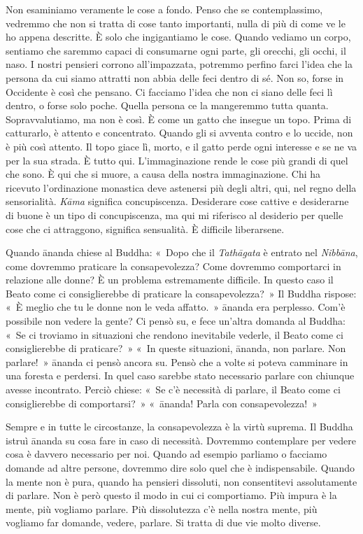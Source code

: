 Non esaminiamo veramente le cose a fondo. Penso che se contemplassimo,
vedremmo che non si tratta di cose tanto importanti, nulla di più di
come ve le ho appena descritte. È solo che ingigantiamo le cose. Quando
vediamo un corpo, sentiamo che saremmo capaci di consumarne ogni parte,
gli orecchi, gli occhi, il naso. I nostri pensieri corrono
all'impazzata, potremmo perfino farci l'idea che la persona da cui siamo
attratti non abbia delle feci dentro di sé. Non so, forse in Occidente è
così che pensano. Ci facciamo l'idea che non ci siano delle feci lì
dentro, o forse solo poche. Quella persona ce la mangeremmo tutta
quanta. Sopravvalutiamo, ma non è così. È come un gatto che insegue un
topo. Prima di catturarlo, è attento e concentrato. Quando gli si
avventa contro e lo uccide, non è più così attento. Il topo giace lì,
morto, e il gatto perde ogni interesse e se ne va per la sua strada. È
tutto qui. L'immaginazione rende le cose più grandi di quel che sono. È
qui che si muore, a causa della nostra immaginazione. Chi ha ricevuto
l'ordinazione monastica deve astenersi più degli altri, qui, nel regno
della sensorialità. \emph{Kāma} significa concupiscenza. Desiderare cose
cattive e desiderarne di buone è un tipo di concupiscenza, ma qui mi
riferisco al desiderio per quelle cose che ci attraggono, significa
sensualità. È difficile liberarsene.

Quando ānanda chiese al Buddha: «~Dopo che il \emph{Tathāgata} è entrato
nel \emph{Nibbāna}, come dovremmo praticare la consapevolezza? Come
dovremmo comportarci in relazione alle donne? È un problema estremamente
difficile. In questo caso il Beato come ci consiglierebbe di praticare
la consapevolezza?~» Il Buddha rispose: «~È meglio che tu le donne non
le veda affatto.~» ānanda era perplesso. Com'è possibile non vedere la
gente? Ci pensò su, e fece un'altra domanda al Buddha: «~Se ci troviamo
in situazioni che rendono inevitabile vederle, il Beato come ci
consiglierebbe di praticare?~» «~In queste situazioni, ānanda, non
parlare. Non parlare!~» ānanda ci pensò ancora su. Pensò che a volte si
poteva camminare in una foresta e perdersi. In quel caso sarebbe stato
necessario parlare con chiunque avesse incontrato. Perciò chiese: «~Se
c'è necessità di parlare, il Beato come ci consiglierebbe di
comportarsi?~» «~ānanda! Parla con consapevolezza!~»

Sempre e in tutte le circostanze, la consapevolezza è la virtù suprema.
Il Buddha istruì ānanda su cosa fare in caso di necessità. Dovremmo
contemplare per vedere cosa è davvero necessario per noi. Quando ad
esempio parliamo o facciamo domande ad altre persone, dovremmo dire solo
quel che è indispensabile. Quando la mente non è pura, quando ha
pensieri dissoluti, non consentitevi assolutamente di parlare. Non è
però questo il modo in cui ci comportiamo. Più impura è la mente, più
vogliamo parlare. Più dissolutezza c'è nella nostra mente, più vogliamo
far domande, vedere, parlare. Si tratta di due vie molto diverse.

